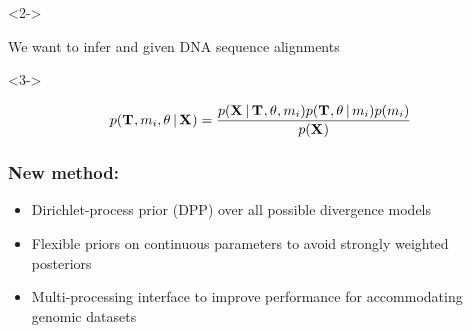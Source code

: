 \begin{frame}[t]
    \vspace{3.5mm}

    \begin{minipage}[c][0.35\textheight][c]{\linewidth}
        \begin{uncoverenv}<2->
            \begin{center}
            We want to infer \textcolor{blue}{\divModel{}} and
            \textcolor{blue}{\divTimeMapVector} given DNA sequence
            alignments
            \textcolor{blue}{\alignmentVector}
        \end{center}
        \end{uncoverenv}

        \vspace{4mm}

        \begin{uncoverenv}<3->
            \begin{displaybox}[0.85\linewidth]
                \begin{minipage}[c][0.12\textheight][c]{\linewidth}

                \[
                    p(\divTimeMapVector,
                      \divModel{i},
                      \allParameters{}
                      \given \alignmentVector)
                      =
                    \frac{
                        p(\alignmentVector \given
                          \divTimeMapVector,
                          \allParameters{},
                          \divModel{i})
                        p(\divTimeMapVector,
                          \allParameters{}
                          \given \divModel{i})
                        p(\divModel{i})
                        }{p(\alignmentVector)}
                \]
                \vspace{-1mm}
                \end{minipage}
            \end{displaybox}
        \end{uncoverenv}
    \end{minipage}
\end{frame}

\begin{frame}
    \frametitle{New method: \dppmsbayes}
    \begin{itemize}
        \item<1-> Dirichlet-process prior (DPP) over all possible divergence
            models
        \item<2-> Flexible priors on continuous parameters to avoid strongly
            weighted posteriors
        \item<3-> Multi-processing interface to improve performance for
            accommodating genomic datasets
    \end{itemize}
\end{frame}

